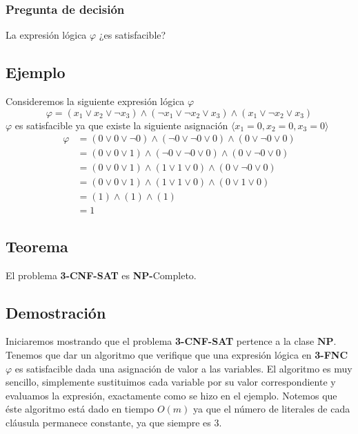 \documentclass[a4paper]{article}
\begin{document}
\subsubsection{Pregunta de decisión}
\noindent
La expresión lógica \(\varphi\) ¿es satisfacible?
\subsection{Ejemplo}
\noindent
Consideremos la siguiente expresión lógica \(\varphi\)
\[
    \varphi = \left(x_{1} \lor x_{2} \lor \neg x_{3}\right) \land \left(\neg x_{1} \lor \neg x_{2} \lor x_{3}\right) \land \left(x_{1} \lor \neg x_{2} \lor x_{3}\right)
\]
\(\varphi\) es satisfacible ya que existe la siguiente asignación \(\langle x_{1} = 0, x_{2} = 0, x_{3} = 0 \rangle\)
\begin{align*}
    \varphi &= \left(0 \lor 0 \lor \neg 0\right) \land \left(\neg 0 \lor \neg 0 \lor 0\right) \land \left(0 \lor \neg 0 \lor 0\right) \\
            &= \left(0 \lor 0 \lor 1\right) \land \left(\neg 0 \lor \neg 0 \lor 0\right) \land \left(0 \lor \neg 0 \lor 0\right) \\
            &= \left(0 \lor 0 \lor 1\right) \land \left(1 \lor 1 \lor 0\right) \land \left(0 \lor \neg 0 \lor 0\right) \\
            &= \left(0 \lor 0 \lor 1\right) \land \left(1 \lor 1 \lor 0\right) \land \left(0 \lor 1 \lor 0\right) \\
            &= \left(1\right) \land \left(1\right) \land \left(1\right) \\
            &= 1
\end{align*}
\subsection{Teorema}
\noindent
El problema \textbf{3-CNF-SAT} es \textbf{NP-}Completo.
\newpage
\subsection{Demostración}
\noindent
Iniciaremos mostrando que el problema \textbf{3-CNF-SAT} pertence a la clase \(\mathbf{NP}\). 
\newline 
Tenemos que dar un algoritmo que verifique que una expresión lógica en \textbf{3-FNC} \(\varphi\) es satisfacible dada una 
asignación de valor a las variables. El algoritmo es muy sencillo, simplemente sustituimos cada variable 
por su valor correspondiente y evaluamos la expresión, exactamente como se hizo en el ejemplo. Notemos que 
éste algoritmo está dado en tiempo \(O\left(m\right)\) ya que el número de literales de cada cláusula permanece constante, 
ya que siempre es \(3\).
\end{document}
